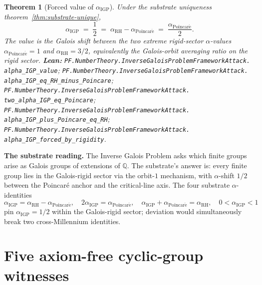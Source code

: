 \documentclass[11pt,a4paper]{article}
\theoremstyle{plain}
\newtheorem{theorem}{Theorem}[section]
\theoremstyle{definition}
\begin{document}
\begin{theorem}[Forced value of $\alpha_{\mathrm{IGP}}$]
\label{thm:igp-forced}
Under the substrate uniqueness theorem~\ref{thm:substrate-unique},
\[
\alpha_{\mathrm{IGP}} \;=\; \frac{1}{2} \;=\;
\alpha_{\mathrm{RH}} - \alpha_{\mathrm{Poincar\acute e}}
\;=\; \frac{\alpha_{\mathrm{Poincar\acute e}}}{2}.
\]
The value is the \emph{Galois shift} between the two extreme
rigid-sector $\alpha$-values $\alpha_{\mathrm{Poincar\acute e}} = 1$ and
$\alpha_{\mathrm{RH}} = 3/2$, equivalently the Galois-orbit averaging
ratio on the rigid sector.
\textbf{Lean:}
\texttt{PF.NumberTheory.InverseGaloisProblemFrameworkAttack.\\
alpha\_IGP\_value};
\texttt{PF.NumberTheory.InverseGaloisProblemFrameworkAttack.\\
alpha\_IGP\_eq\_RH\_minus\_Poincare};
\texttt{PF.NumberTheory.InverseGaloisProblemFrameworkAttack.\\
two\_alpha\_IGP\_eq\_Poincare};
\texttt{PF.NumberTheory.InverseGaloisProblemFrameworkAttack.\\
alpha\_IGP\_plus\_Poincare\_eq\_RH};
\texttt{PF.NumberTheory.InverseGaloisProblemFrameworkAttack.\\
alpha\_IGP\_forced\_by\_rigidity}.
\end{theorem}

\textbf{The substrate reading.}
The Inverse Galois Problem asks which finite groups arise as Galois
groups of extensions of $\mathbb{Q}$. The substrate's answer is: every
finite group lies in the Galois-rigid sector via the orbit-$1$
mechanism, with $\alpha$-shift $1/2$ between the Poincaré anchor and
the critical-line axis. The four substrate $\alpha$-identities
\[
\alpha_{\mathrm{IGP}} = \alpha_{\mathrm{RH}} -
  \alpha_{\mathrm{Poincar\acute e}}, \quad
2\alpha_{\mathrm{IGP}} = \alpha_{\mathrm{Poincar\acute e}}, \quad
\alpha_{\mathrm{IGP}} + \alpha_{\mathrm{Poincar\acute e}} =
  \alpha_{\mathrm{RH}}, \quad
0 < \alpha_{\mathrm{IGP}} < 1
\]
pin $\alpha_{\mathrm{IGP}} = 1/2$ within the Galois-rigid sector;
deviation would simultaneously break two cross-Millennium identities.

\section{Five axiom-free cyclic-group witnesses}
\label{sec:witnesses}
\end{document}
